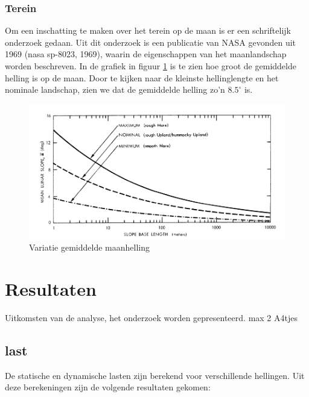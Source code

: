 \documentclass{article}
\begin{document}
            \subsubsection*{Terein}
                Om een inschatting te maken over het terein op de maan is er een schriftelijk onderzoek gedaan.
                Uit dit onderzoek is een publicatie van NASA gevonden uit 1969 (nasa sp-8023, 1969), waarin de eigenschappen van het maanlandschap worden beschreven.
                In de grafiek in figuur \ref{fig:maanhelling} is te zien hoe groot de gemiddelde helling is op de maan.
                Door te kijken naar de kleinste hellinglengte en het nominale landschap, zien we dat de gemiddelde helling zo'n $8.5^\circ$ is.

                \begin{figure}[h]
                    \includegraphics[width=\textwidth]{variation_of_mean_lunar_slope}
                    \caption{Variatie gemiddelde maanhelling}
                    \label{fig:maanhelling}
                    \centering
                \end{figure}
                
    \pagebreak
    \section{Resultaten}
        Uitkomsten van de analyse, het onderzoek worden gepresenteerd. max 2 A4tjes

        \subsection{last}
        De statische en dynamische lasten zijn berekend voor verschillende hellingen. 
        Uit deze berekeningen zijn de volgende resultaten gekomen: 
\end{document}
